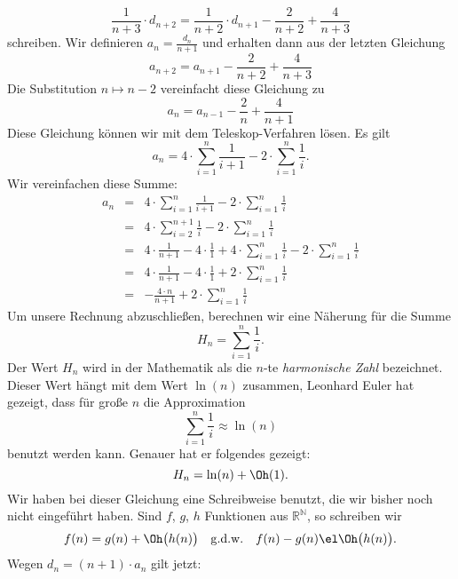 \begin{equation}
  \label{eq:qs9}
 \frac{1}{n+3} \cdot d_{n+2} = \frac{1}{n+2}\cdot d_{n+1} - \frac{2}{n+2} + \frac{4}{n+3}  
\end{equation}
schreiben.  Wir definieren $\displaystyle a_n = \frac{d_n}{n+1}$ und erhalten dann aus der
letzten Gleichung 
\[ a_{n+2} = a_{n+1} - \frac{2}{n+2} + \frac{4}{n+3} \]
Die Substitution $n \mapsto n-2$ vereinfacht diese Gleichung zu 
\begin{equation}
  \label{eq:qs10}
 a_{n} = a_{n-1} - \frac{2}{n} + \frac{4}{n+1}  
\end{equation}
Diese Gleichung k\"onnen wir mit dem Teleskop-Verfahren l\"osen.  Es gilt 
\begin{equation}
  \label{eq:qs11}
 a_{n} = 4 \cdot \sum_{i=1}^n \frac{1}{i+1} - 2 \cdot \sum_{i=1}^n \frac{1}{i}.  
\end{equation}
Wir vereinfachen diese Summe:
\[
\begin{array}{lcl}
 a_{n} & = & \displaystyle 4 \cdot \sum_{i=1}^n \frac{1}{i+1} - 2 \cdot \sum_{i=1}^n \frac{1}{i} \\[0.5cm]
       & = & \displaystyle 4 \cdot \sum_{i=2}^{n+1} \frac{1}{i} - 2 \cdot \sum_{i=1}^n \frac{1}{i} \\[0.5cm]
       & = & \displaystyle 4 \cdot \frac{1}{n+1} - 4 \cdot \frac{1}{1} + 4 \cdot \sum_{i=1}^{n} \frac{1}{i} - 2 \cdot \sum_{i=1}^n \frac{1}{i} \\[0.5cm]
       & = & \displaystyle 4 \cdot \frac{1}{n+1} - 4 \cdot \frac{1}{1} + 2 \cdot \sum_{i=1}^{n} \frac{1}{i}  \\[0.5cm]
       & = & \displaystyle - \frac{4 \cdot n}{n+1}  + 2 \cdot \sum_{i=1}^{n} \frac{1}{i}  
\end{array}
\]
Um unsere Rechnung abzuschlie{\ss}en, berechnen wir eine N\"aherung f\"ur die Summe 
\[ H_n = \sum\limits_{i=1}^{n}\frac{1}{i}.\]
Der Wert $H_n$ wird in der Mathematik als die $n$-te \emph{harmonische Zahl} bezeichnet.
Dieser Wert h\"angt mit dem Wert $\ln(n)$ zusammen, Leonhard Euler hat gezeigt, dass f\"ur
gro{\ss}e $n$ die Approximation
\[ \sum\limits_{i=1}^n \frac{1}{i} \approx \ln(n)  \]
benutzt werden kann.  Genauer hat er folgendes gezeigt:
\[ H_n = \ln(n) + \Oh(1). \]
Wir haben bei dieser Gleichung eine Schreibweise benutzt, die wir bisher noch nicht
eingef\"uhrt haben.  Sind $f$, $g$, $h$ Funktionen aus $\mathbb{R}^\mathbb{N}$, so schreiben
wir 
\[ f(n) = g(n) + \Oh\bigl(h(n)\bigr) \quad \mathrm{g.d.w.} \quad
   f(n) - g(n) \el \Oh\bigl(h(n)\bigr). 
\]
Wegen $d_n = (n+1) \cdot a_{n}$ gilt jetzt: 
